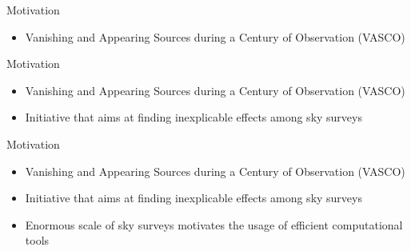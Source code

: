 \begin{frame}{Motivation}
    \begin{itemize}
        \item Vanishing and Appearing Sources during a Century of Observation (VASCO)
    \end{itemize}
\end{frame}

\begin{frame}{Motivation}
    \begin{itemize}
        \item Vanishing and Appearing Sources during a Century of Observation (VASCO)
        \item Initiative that aims at finding inexplicable effects among sky surveys
    \end{itemize}
\end{frame}

\begin{frame}{Motivation}
    \begin{itemize}
        \item Vanishing and Appearing Sources during a Century of Observation (VASCO)
        \item Initiative that aims at finding inexplicable effects among sky surveys
        \item Enormous scale of sky surveys motivates the usage of efficient computational tools
    \end{itemize}
\end{frame}